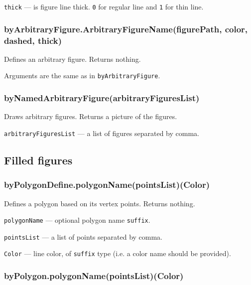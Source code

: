 \documentclass{ltxdoc}
\begin{document}
\texttt{thick} — is figure line thick. \texttt{0} for regular line and \texttt{1} for thin line.

\subsubsection{byArbitraryFigure.ArbitraryFigureName(figurePath, color, dashed, thick)}

Defines an arbitrary figure. Returns nothing.

Arguments are the same as in \texttt{byArbitraryFigure}.

\subsubsection{byNamedArbitraryFigure(arbitraryFiguresList)}

Draws arbitrary figures. Returns a picture of the figures.

\texttt{arbitraryFiguresList} — a list of figures separated by comma.


\subsection{Filled figures}


\subsubsection{byPolygonDefine.polygonName(pointsList)(Color)}

Defines a polygon based on its vertex points. Returns nothing.

\texttt{polygonName} — optional polygon name \texttt{suffix}.

\texttt{pointsList} — a list of points separated by comma.

\texttt{Color} — line color, of \texttt{suffix} type (i.e. a color name should be provided).


\subsubsection{byPolygon.polygonName(pointsList)(Color)}
\end{document}
